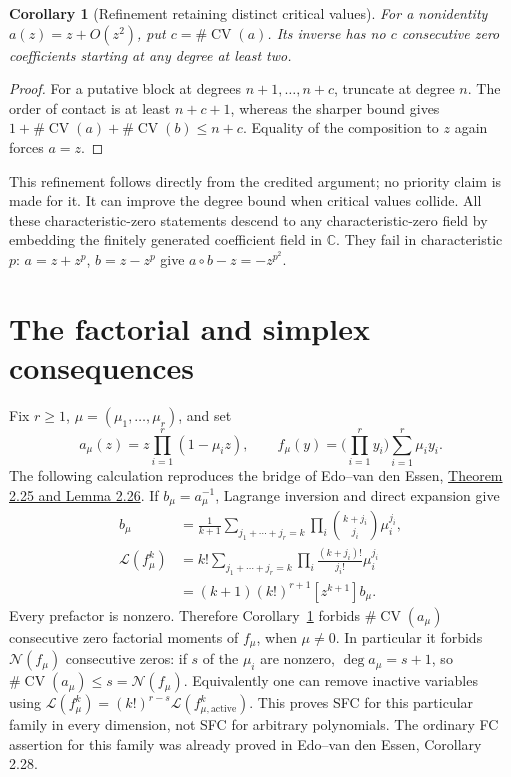 \documentclass[11pt]{article}
\newtheorem{corollary}[theorem]{Corollary}
\DeclareMathOperator{\CV}{CV}
\newcommand{\C}{\mathbb C}
\newcommand{\Lfac}{\mathcal L}
\begin{document}
\begin{corollary}[Refinement retaining distinct critical values]\label{cor:refined}
For a nonidentity $a(z)=z+O(z^2)$, put $c=\#\CV(a)$.
Its inverse has no $c$ consecutive zero coefficients starting at any
degree at least two.
\end{corollary}
\begin{proof}
For a putative block at degrees $n+1,\ldots,n+c$, truncate at degree $n$.
The order of contact is at least $n+c+1$, whereas the sharper bound gives
$1+\#\CV(a)+\#\CV(b)\leq n+c$. Equality of the composition to $z$ again
forces $a=z$.
\end{proof}
This refinement follows directly from the credited argument; no priority
claim is made for it. It can improve the degree bound when critical values
collide. All these characteristic-zero statements descend to any
characteristic-zero field by embedding the finitely generated coefficient
field in $\C$. They fail in characteristic $p$: $a=z+z^p$, $b=z-z^p$
give $a\circ b-z=-z^{p^2}$.

\section*{The factorial and simplex consequences}
Fix $r\geq1$, $\mu=(\mu_1,\ldots,\mu_r)$, and set
\[
 a_\mu(z)=z\prod_{i=1}^r(1-\mu_i z),\qquad
 f_\mu(y)=\Big(\prod_{i=1}^r y_i\Big)\sum_{i=1}^r\mu_i y_i.
\]
The following calculation reproduces the bridge of Edo--van den Essen,
\href{https://arxiv.org/abs/1304.3956}{Theorem 2.25 and Lemma 2.26}.
If $b_\mu=a_\mu^{-1}$, Lagrange inversion and direct expansion give
\begin{align*}
 [z^{k+1}]b_\mu
 &=\frac1{k+1}\sum_{j_1+\cdots+j_r=k}
       \prod_i\binom{k+j_i}{j_i}\mu_i^{j_i},\\
 \Lfac(f_\mu^k)
 &=k!\sum_{j_1+\cdots+j_r=k}
       \prod_i\frac{(k+j_i)!}{j_i!}\mu_i^{j_i}\\
 &=(k+1)(k!)^{r+1}[z^{k+1}]b_\mu.                 \tag{1}
\end{align*}
Every prefactor is nonzero. Therefore Corollary~\ref{cor:refined} forbids
$\#\CV(a_\mu)$ consecutive zero factorial moments of $f_\mu$, when
$\mu\ne0$. In particular it forbids $\mathcal N(f_\mu)$ consecutive zeros:
if $s$ of the $\mu_i$ are nonzero, $\deg a_\mu=s+1$, so
$\#\CV(a_\mu)\leq s=\mathcal N(f_\mu)$. Equivalently one can remove
inactive variables using
$\Lfac(f_\mu^k)=(k!)^{r-s}\Lfac(f_{\mu,\mathrm{active}}^k)$.
This proves SFC for this particular family in every dimension, not SFC
for arbitrary polynomials. The ordinary FC assertion for this family was
already proved in Edo--van den Essen, Corollary 2.28.
\end{document}
